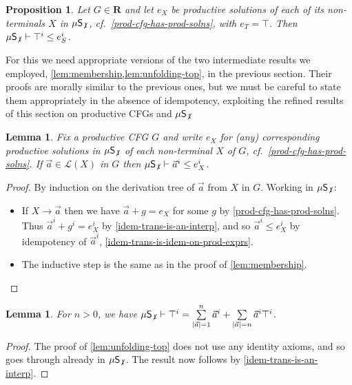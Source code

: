 \documentclass[a4paper,10pt]{amsart}
\newtheorem{lemma}[theorem]{Lemma}
\newtheorem{proposition}[theorem]{Proposition}
\theoremstyle{definition}
\newcommand{\proves}{\vdash}
\newcommand{\Lang}{\mathcal L}
\newcommand{\lang}[1]{\Lang(#1)}
\newcommand{\id}{\mathsf{init}}
\newcommand{\basicax}{\mu\mathsf{S}}
\newcommand{\regtot}{\mathbf R}
\newcommand{\basicaxidfree}{\basicax_{\not {\hspace{.1em}1}}}
\renewcommand{\id}[1]{#1^i}
\begin{document}
\begin{proposition}
\label{reg-tot-prov-under-idem-trans}
    Let $G \in \regtot$ and let $e_X$ be productive solutions of each of its non-terminals $X$ in $\basicaxidfree$, cf.~\cref{prod-cfg-has-prod-solns}, with $e_T = \top$. 
    Then $\basicaxidfree \proves \id\top \leq \id{e_S}$. 
\end{proposition}

For this we need appropriate versions of the two intermediate results we employed, \cref{lem:membership,lem:unfolding-top}, in the previous section.
Their proofs are morally similar to the previous ones, but we must be careful to state them appropriately in the absence of idempotency, exploiting the refined results of this section on productive CFGs and $\basicaxidfree$
\begin{lemma}
\label{lem:membership-productive}
    Fix a productive CFG $G$ and write $e_X$ for (any) corresponding productive solutions in $\basicaxidfree$ of each non-terminal $X$ of $G$, cf.~\cref{prod-cfg-has-prod-solns}.
    If $\vec a \in \lang X$ in $G$ then $\basicaxidfree \proves \id{\vec a} \leq \id e_X$.
\end{lemma}
\begin{proof}
    By induction on the derivation tree of $\vec a $ from $X$ in $G$. Working in $\basicaxidfree$:
    \begin{itemize}
        \item If $X\to \vec a $ then we have $\vec a + g = e_X$ for some $g$ by \cref{prod-cfg-has-prod-solns}.
        Thus $\id{\vec a} + \id g = \id e_X$ by \cref{idem-trans-is-an-interp}, and so $\id{\vec a} \leq \id{e_X}$ by idempotency of $\id{\vec a}$, \cref{idem-trans-is-idem-on-prod-exprs}.
        \item The inductive step is the same as in the proof of \cref{lem:membership}. \qedhere
    \end{itemize}
\end{proof}


\begin{lemma}
\label{lem:unfolding-top-no-id}
    For $n>0$, we have $\basicaxidfree \proves \id\top = \sum\limits_{|\vec a|=1}^{n}\id{\vec a} + \sum\limits_{|\vec a|= n} \id{\vec a} \id\top$.
\end{lemma}
\begin{proof}
    The proof of \cref{lem:unfolding-top} does not use any identity axioms, and so goes through already in $\basicaxidfree$.
    The result now follows by \cref{idem-trans-is-an-interp}.
\end{proof}
\end{document}

